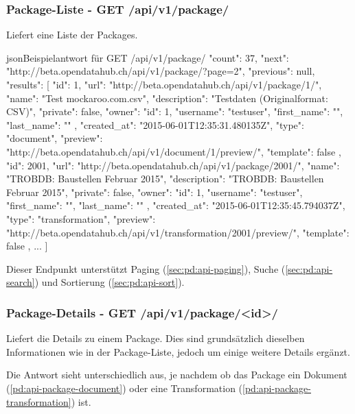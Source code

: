 \subsubsection{Package-Liste - GET /api/v1/package/}\label{sec:pd:api-package-list}
Liefert eine Liste der Packages.

\begin{srclst}{json}{Beispielantwort für GET /api/v1/package/}
{
    "count": 37, 
    "next": "http://beta.opendatahub.ch/api/v1/package/?page=2", 
    "previous": null, 
    "results": [
        {
            "id": 1, 
            "url": "http://beta.opendatahub.ch/api/v1/package/1/", 
            "name": "Test mockaroo.com.csv", 
            "description": "Testdaten (Originalformat: CSV)", 
            "private": false, 
            "owner": {
                "id": 1, 
                "username": "testuser", 
                "first_name": "", 
                "last_name": ""
            }, 
            "created_at": "2015-06-01T12:35:31.480135Z", 
            "type": "document", 
            "preview": "http://beta.opendatahub.ch/api/v1/document/1/preview/", 
            "template": false
        }, 
        {
            "id": 2001, 
            "url": "http://beta.opendatahub.ch/api/v1/package/2001/", 
            "name": "TROBDB: Baustellen Februar 2015", 
            "description": "TROBDB: Baustellen Februar 2015", 
            "private": false, 
            "owner": {
                "id": 1, 
                "username": "testuser", 
                "first_name": "", 
                "last_name": ""
            }, 
            "created_at": "2015-06-01T12:35:45.794037Z", 
            "type": "transformation", 
            "preview": "http://beta.opendatahub.ch/api/v1/transformation/2001/preview/", 
            "template": false
        },
        ...
    ]
}
\end{srclst}

Dieser Endpunkt unterstützt Paging (\cref{sec:pd:api-paging}), Suche (\cref{sec:pd:api-search}) und Sortierung (\cref{sec:pd:api-sort}).

\subsubsection{Package-Details - GET /api/v1/package/<id>/}\label{sec:pd:api-package-details}
Liefert die Details zu einem Package. Dies sind grundsätzlich dieselben Informationen wie in der Package-Liste, jedoch um einige weitere Details ergänzt.

Die Antwort sieht unterschiedlich aus, je nachdem ob das Package ein Dokument (\cref{pd:api-package-document}) oder eine Transformation (\cref{pd:api-package-transformation}) ist.

